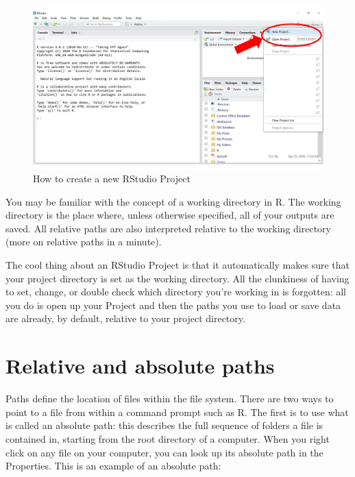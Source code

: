 \documentclass[
]{book}
\begin{document}
\begin{figure}

{\centering \includegraphics[width=17.78in]{img/rstudio-project} 

}

\caption{How to create a new RStudio Project}\label{fig:rstudio-proj}
\end{figure}

You may be familiar with the concept of a working directory in R. The working directory is the place where, unless otherwise specified, all of your outputs are saved. All relative paths are also interpreted relative to the working directory (more on relative paths in a minute).

The cool thing about an RStudio Project is that it automatically makes sure that your project directory is set as the working directory. All the clunkiness of having to set, change, or double check which directory you're working in is forgotten: all you do is open up your Project and then the paths you use to load or save data are already, by default, relative to your project directory.

\hypertarget{relative-and-absolute-paths}{%
\section{Relative and absolute paths}\label{relative-and-absolute-paths}}

Paths define the location of files within the file system. There are two ways to point to a file from within a command prompt such as R. The first is to use what is called an absolute path: this describes the full sequence of folders a file is contained in, starting from the root directory of a computer. When you right click on any file on your computer, you can look up its absolute path in the Properties. This is an example of an absolute path:
\end{document}
